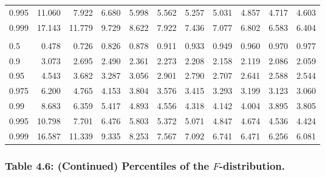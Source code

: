 \documentclass[
]{article}
\begin{document}
\begin{table}[H]
\begin{tabular}{lrrrrrrrrrr}
\hspace{1em}0.995 & 11.060 & 7.922 & 6.680 & 5.998 & 5.562 & 5.257 & 5.031 & 4.857 & 4.717 & 4.603\\
\hspace{1em}0.999 & 17.143 & 11.779 & 9.729 & 8.622 & 7.922 & 7.436 & 7.077 & 6.802 & 6.583 & 6.404\\
\addlinespace[0.3em]
\multicolumn{11}{l}{\textbf{$k_2=15$}}\\
\hspace{1em}0.5 & 0.478 & 0.726 & 0.826 & 0.878 & 0.911 & 0.933 & 0.949 & 0.960 & 0.970 & 0.977\\
\hspace{1em}0.9 & 3.073 & 2.695 & 2.490 & 2.361 & 2.273 & 2.208 & 2.158 & 2.119 & 2.086 & 2.059\\
\hspace{1em}0.95 & 4.543 & 3.682 & 3.287 & 3.056 & 2.901 & 2.790 & 2.707 & 2.641 & 2.588 & 2.544\\
\hspace{1em}0.975 & 6.200 & 4.765 & 4.153 & 3.804 & 3.576 & 3.415 & 3.293 & 3.199 & 3.123 & 3.060\\
\hspace{1em}0.99 & 8.683 & 6.359 & 5.417 & 4.893 & 4.556 & 4.318 & 4.142 & 4.004 & 3.895 & 3.805\\
\hspace{1em}0.995 & 10.798 & 7.701 & 6.476 & 5.803 & 5.372 & 5.071 & 4.847 & 4.674 & 4.536 & 4.424\\
\hspace{1em}0.999 & 16.587 & 11.339 & 9.335 & 8.253 & 7.567 & 7.092 & 6.741 & 6.471 & 6.256 & 6.081\\
\bottomrule
\end{tabular}
\end{table}

\newpage

\hypertarget{table-4.6-continued-percentiles-of-the-f-distribution.}{%
\subsubsection{\texorpdfstring{Table 4.6: (Continued) Percentiles of the
\(F\)-distribution.}{Table 4.6: (Continued) Percentiles of the F-distribution.}}\label{table-4.6-continued-percentiles-of-the-f-distribution.}}
\end{document}
